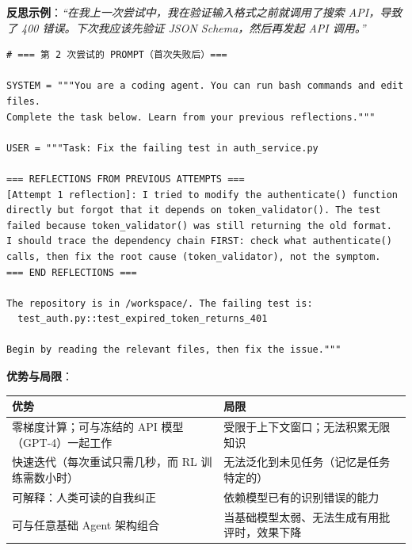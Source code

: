 \textbf{反思示例}：\emph{``在我上一次尝试中，我在验证输入格式之前就调用了搜索 API，导致了 400 错误。下次我应该先验证 JSON Schema，然后再发起 API 调用。''}

\begin{examplebox}
\begin{lstlisting}[style=pythonstyle]
# === 第 2 次尝试的 PROMPT（首次失败后）===

SYSTEM = """You are a coding agent. You can run bash commands and edit files.
Complete the task below. Learn from your previous reflections."""

USER = """Task: Fix the failing test in auth_service.py

=== REFLECTIONS FROM PREVIOUS ATTEMPTS ===
[Attempt 1 reflection]: I tried to modify the authenticate() function
directly but forgot that it depends on token_validator(). The test
failed because token_validator() was still returning the old format.
I should trace the dependency chain FIRST: check what authenticate()
calls, then fix the root cause (token_validator), not the symptom.
=== END REFLECTIONS ===

The repository is in /workspace/. The failing test is:
  test_auth.py::test_expired_token_returns_401

Begin by reading the relevant files, then fix the issue."""
\end{lstlisting}
\end{examplebox}

\textbf{优势与局限}：

{\small
\noindent\begin{tabularx}{\linewidth}{@{}Z{1.03} Z{0.97}@{}}
\toprule
\textbf{优势} & \textbf{局限} \\
\midrule
零梯度计算；可与冻结的 API 模型（GPT-4）一起工作 & 受限于上下文窗口；无法积累无限知识 \\
快速迭代（每次重试只需几秒，而 RL 训练需数小时） & 无法泛化到未见任务（记忆是任务特定的） \\
可解释：人类可读的自我纠正 & 依赖模型已有的识别错误的能力 \\
可与任意基础 Agent 架构组合 & 当基础模型太弱、无法生成有用批评时，效果下降 \\
\bottomrule
\end{tabularx}
}

